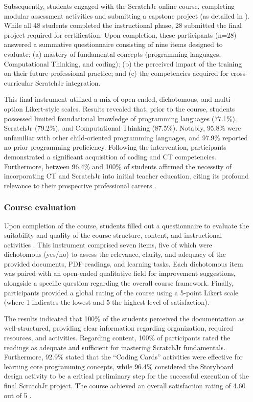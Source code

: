 \documentclass[english]{textolivre}
\begin{document}
Subsequently, students engaged with the ScratchJr online course, completing modular assessment activities and submitting a capstone project (as detailed in ). While all 48 students completed the instructional phase, 28 submitted the final project required for certification. Upon completion, these participants (n=28) answered a summative questionnaire consisting of nine items designed to evaluate: (a) mastery of fundamental concepts (programming languages, Computational Thinking, and coding); (b) the perceived impact of the training on their future professional practice; and (c) the competencies acquired for cross-curricular ScratchJr integration.

This final instrument utilized a mix of open-ended, dichotomous, and multi-option Likert-style scales. Results \cite{ibanez2023evaluation} revealed that, prior to the course, students possessed limited foundational knowledge of programming languages (77.1\%), ScratchJr (79.2\%), and Computational Thinking (87.5\%). Notably, 95.8\% were unfamiliar with other child-oriented programming languages, and 97.9\% reported no prior programming proficiency. Following the intervention, participants demonstrated a significant acquisition of coding and CT competencies. Furthermore, between 96.4\% and 100\% of students affirmed the necessity of incorporating CT and ScratchJr into initial teacher education, citing its profound relevance to their prospective professional careers \cite{ibanez2023evaluation}.

\subsubsection{Course evaluation}
Upon completion of the course, students filled out a questionnaire to evaluate the suitability and quality of the course structure, content, and instructional activities \cite{mirandapinto2023evaluation}. This instrument comprised seven items, five of which were dichotomous (yes/no) to assess the relevance, clarity, and adequacy of the provided documents, PDF readings, and learning tasks. Each dichotomous item was paired with an open-ended qualitative field for improvement suggestions, alongside a specific question regarding the overall course framework. Finally, participants provided a global rating of the course using a 5-point Likert scale (where 1 indicates the lowest and 5 the highest level of satisfaction).

The results indicated that 100\% of the students perceived the documentation as well-structured, providing clear information regarding organization, required resources, and activities. Regarding content, 100\% of participants rated the readings as adequate and sufficient for mastering ScratchJr fundamentals. Furthermore, 92.9\% stated that the “Coding Cards” activities were effective for learning core programming concepts, while 96.4\% considered the Storyboard design activity to be a critical preliminary step for the successful execution of the final ScratchJr project. The course achieved an overall satisfaction rating of 4.60 out of 5 \cite{mirandapinto2023evaluation}.
\end{document}
